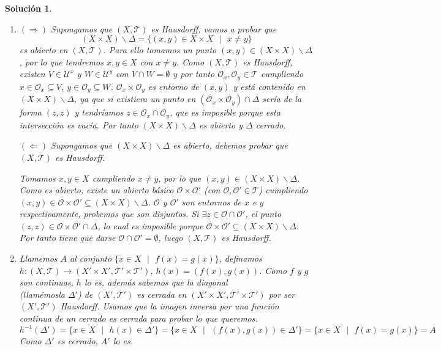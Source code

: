 \documentclass{article}
\theoremstyle{remark,bold} \newtheorem{exercise}{Ejercicio}
\newtheorem*{solution}{Solución}
\begin{document}
\begin{solution}
\begin{enumerate}
  \item $(\Longrightarrow)$ Supongamos que $(X, \mathcal{T})$ es
    Hausdorff, vamos a probar que
    \[(X \times X) \backslash \Delta = \{(x,y) \in X \times X \text{ }
      | \text{ } x \neq y \}\] es abierto en $(X, \mathcal{T})$. Para ello
    tomamos un punto $(x,y) \in (X \times X) \backslash \Delta$, por lo
    que tendremos $x, y \in X$ con $x \neq y$. Como $(X, \mathcal{T})$ es
    Hausdorff, existen $V \in \mathcal{U}^x$ y $W \in \mathcal{U}^y$ con
    $V \cap W = \emptyset$ y por tanto $\mathcal{O}_x,\mathcal{O}_y \in
    \mathcal{T}$ cumpliendo $x \in \mathcal{O}_x \subseteq V$, $y \in
    \mathcal{O}_y \subseteq W$. $\mathcal{O}_x \times \mathcal{O}_y$ es
    entorno de $(x,y)$ y está contenido en $(X \times X) \backslash
    \Delta$, ya que si existiera un punto en $(\mathcal{O}_x \times
    \mathcal{O}_y) \cap \Delta$ sería de la forma $(z,z)$ y tendríamos $z
    \in \mathcal{O}_x \cap \mathcal{O}_y$, que es imposible porque esta
    intersección es vacía. Por tanto $(X \times X) \backslash \Delta$ es
    abierto y $\Delta$ cerrado.

    $(\Longleftarrow)$ Supongamos que $(X \times X) \backslash \Delta$
    es abierto, debemos probar que $(X, \mathcal{T})$ es Hausdorff.

    Tomamos $x, y \in X$ cumpliendo $x \neq y$, por lo que $(x, y) \in
    (X \times X) \backslash \Delta$. Como es abierto, existe un abierto
    básico $\mathcal{O} \times \mathcal{O}'$ (con $\mathcal{O},
    \mathcal{O}' \in \mathcal{T}$) cumpliendo $(x,y) \in \mathcal{O}
    \times \mathcal{O}' \subseteq (X \times X) \backslash \Delta$.
    $\mathcal{O}$ y $\mathcal{O}'$ son entornos de $x$ e $y$
    respectivamente, probemos que son disjuntos. Si $\exists z \in
    \mathcal{O} \cap \mathcal{O}'$, el punto $(z,z) \in \mathcal{O} \times
    \mathcal{O}' \cap \Delta$, lo cual es imposible porque $\mathcal{O}
    \times \mathcal{O}' \subseteq (X \times X) \backslash \Delta$. Por
    tanto tiene que darse $\mathcal{O} \cap \mathcal{O}' = \emptyset$,
    luego $(X, \mathcal{T})$ es Hausdorff.

  \item Llamemos $A$ al conjunto $\{x \in X \text{ } | \text{ } f(x) =
    g(x) \}$, definamos $h : (X, \mathcal{T}) \longrightarrow (X' \times
    X', \mathcal{T}' \times \mathcal{T}')$, $h(x) = (f(x), g(x))$. Como
    $f$ y $g$ son continuas, $h$ lo es, además sabemos que la diagonal \\
    (llamémosla $\Delta'$) de $(X', \mathcal{T}')$ es cerrada en $(X'
    \times X', \mathcal{T}' \times \mathcal{T}')$ por ser $(X',
    \mathcal{T}')$ Hausdorff. Usamos que la imagen inversa por una función
    continua de un cerrado es cerrada para probar lo que queremos.
    \[h^{-1}(\Delta') = \{x \in X \text{ } | \text{ } h(x) \in
      \Delta'\} = \{x \in X \text{ } | \text{ } (f(x), g(x)) \in \Delta' \}
      = \{x \in X \text{ } | \text{ } f(x) = g(x) \} = A\] Como $\Delta'$ es
    cerrado, $A'$ lo es.


\end{enumerate}
\end{solution}
\end{document}
